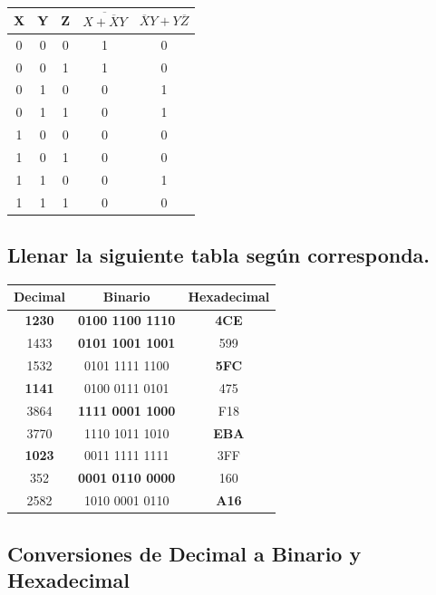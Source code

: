 \begin{table}[h]
\centering
\begin{tabular}{c c c | c | c }
\toprule
X & Y & Z & $\overline{ X + \overline{X}Y}$ & $\overline{X}Y + Y \overline{Z} $ \\
\midrule
0 & 0 & 0 & 1 & 0 \\
0 & 0 & 1 & 1 & 0 \\
0 & 1 & 0 & 0 & 1 \\
0 & 1 & 1 & 0 & 1 \\
1 & 0 & 0 & 0 & 0 \\
1 & 0 & 1 & 0 & 0 \\
1 & 1 & 0 & 0 & 1 \\
1 & 1 & 1 & 0 & 0 \\
\bottomrule
\end{tabular}
\end{table}

\subsection{Llenar la siguiente tabla según corresponda.}

\begin{table}[h]
\centering
\begin{tabular}{| c | c | c |}
\toprule
Decimal & Binario & Hexadecimal \\
\midrule
\textbf{1230} & \textbf{0100 1100 1110} & \textbf{4CE} \\
1433 & \textbf{0101 1001 1001} & 599 \\
1532 & 0101 1111 1100 & \textbf{5FC} \\
\textbf{1141} & 0100 0111 0101 & 475 \\
3864 & \textbf{1111 0001 1000} & F18 \\
3770 & 1110 1011 1010 & \textbf{EBA} \\
\textbf{1023} & 0011 1111 1111 & 3FF \\
352 & \textbf{0001 0110 0000} & 160 \\
2582 & 1010 0001 0110 & \textbf{A16} \\

\bottomrule
\end{tabular}
\end{table}

\newpage

\subsection*{Conversiones de Decimal a Binario y Hexadecimal}


